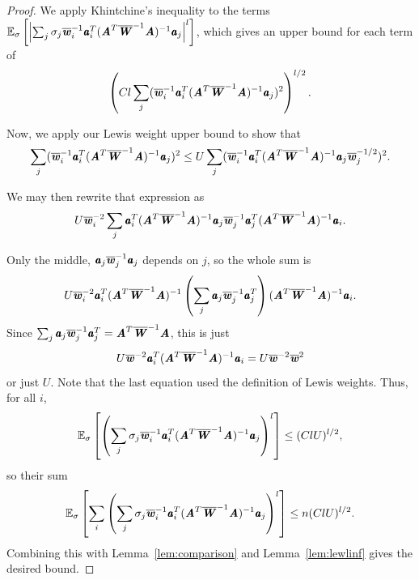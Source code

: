\begin{proof}
We apply Khintchine's inequality to the terms
$\expec{\sigma}{\left | \sum_j \sigma_j \wwbar_i^{-1} \aa_i^T ( \AA^T \WWbar^{-1} \AA )^{-1} \aa_j \right |^{l}}$,
which gives an upper bound for each term of
\begin{equation*}
\left ( Cl \sum_j ( \wwbar_i^{-1} \aa_i^T ( \AA^T \WWbar^{-1} \AA )^{-1} \aa_j )^2 \right )^{l/2}.
\end{equation*}

Now, we apply our Lewis weight upper bound to show that
\begin{equation*}
\sum_j ( \wwbar_i^{-1} \aa_i^T ( \AA^T \WWbar^{-1} \AA )^{-1} \aa_j )^2 \leq U \sum_j ( \wwbar_i^{-1} \aa_i^T ( \AA^T \WWbar^{-1} \AA )^{-1} \aa_j \wwbar_j^{-1/2} )^2.
\end{equation*}

We may then rewrite that expression as
\begin{equation*}
U \wwbar_i^{-2} \sum_j  \aa_i^T ( \AA^T \WWbar^{-1} \AA )^{-1} \aa_j \wwbar_j^{-1} \aa_j^T ( \AA^T \WWbar^{-1} \AA )^{-1} \aa_i.
\end{equation*}

Only the middle, $\aa_j \wwbar_j^{-1} \aa_j$ depends on $j$, so the whole sum is
\begin{equation*}
U \wwbar_i^{-2} \aa_i^T ( \AA^T \WWbar^{-1} \AA )^{-1} \left ( \sum_j \aa_j \wwbar_j^{-1} \aa_j^T \right ) ( \AA^T \WWbar^{-1} \AA )^{-1} \aa_i.
\end{equation*}
Since $\sum_j \aa_j \wwbar_j^{-1} \aa_j^T = \AA^T \WWbar^{-1} \AA$, this is just
\begin{equation*}
U \wwbar^{-2} \aa_i^T ( \AA^T \WWbar^{-1} \AA )^{-1} \aa_i = U \wwbar^{-2} \wwbar^2
\end{equation*}
or just $U$.  Note that the last equation used the definition of Lewis weights.  Thus, for all $i$,
\begin{equation*}
\expec{\sigma}{\left( \sum_j \sigma_j \wwbar_i^{-1} \aa_i^T ( \AA^T \WWbar^{-1} \AA )^{-1} \aa_j \right )^{l}}
\leq (ClU)^{l/2},
\end{equation*}
so their sum
\begin{equation*}
\expec{\sigma}{\sum_i \left( \sum_j \sigma_j \wwbar_i^{-1} \aa_i^T ( \AA^T \WWbar^{-1} \AA )^{-1} \aa_j \right )^{l}} \leq n (ClU)^{l/2}.
\end{equation*}
Combining this with Lemma~\ref{lem:comparison} and Lemma~\ref{lem:lewlinf} gives the desired bound.
\end{proof}


